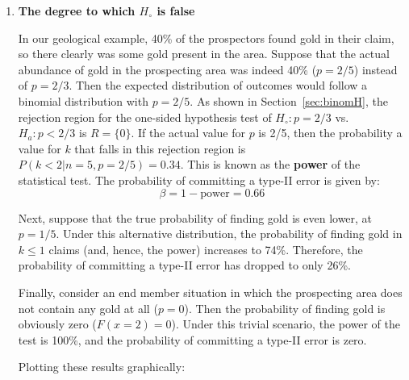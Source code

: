 \begin{enumerate}
\item{\bf The degree to which $H_\circ$ is false}
  
  In our geological example, 40\% of the prospectors found gold in
  their claim, so there clearly was some gold present in the
  area. Suppose that the actual abundance of gold in the prospecting
  area was indeed 40\% ($p=2/5$) instead of $p=2/3$.  Then the
  expected distribution of outcomes would follow a binomial
  distribution with $p=2/5$. As shown in Section~\ref{sec:binomH}, the
  rejection region for the one-sided hypothesis test of $H_\circ:
  p=2/3$ vs. $H_a: p<2/3$ is $R=\{0\}$. If the actual value for $p$ is
  2/5, then the probability a value for $k$ that falls in this
  rejection region is $P(k<2|n=5,p=2/5)=0.34$. This is known as the
  \textbf{power} of the statistical test. The probability of
  committing a type-II error is given by:
  \begin{equation}
    \beta = 1 - \mbox{power} = 0.66
  \end{equation}

  Next, suppose that the true probability of finding gold is even
  lower, at $p=1/5$. Under this alternative distribution, the
  probability of finding gold in ${k}\leq{1}$ claims (and, hence, the
  power) increases to 74\%. Therefore, the probability of committing a
  type-II error has dropped to only 26\%.

  Finally, consider an end member situation in which the prospecting
  area does not contain any gold at all ($p=0$). Then the probability
  of finding gold is obviously zero ($F(x=2)=0$). Under this trivial
  scenario, the power of the test is 100\%, and the probability of
  committing a type-II error is zero.

  Plotting these results graphically:


\end{enumerate}

